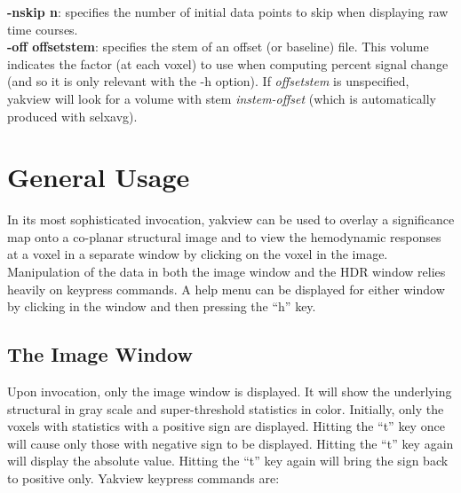 \documentclass[10pt]{article}
\begin{document}
\noindent
{\bf -nskip n}: specifies the number of initial data points to skip
when displaying raw time courses.\\

\noindent
{\bf -off offsetstem}: specifies the stem of an offset (or baseline)
file.  This volume indicates the factor (at each voxel) to use when
computing percent signal change (and so it is only relevant with the
-h option).  If {\em offsetstem} is unspecified, yakview will look for
a volume with stem {\em instem-offset} (which is automatically
produced with selxavg).\\

\section{General Usage}

In its most sophisticated invocation, yakview can be used to overlay a
significance map onto a co-planar structural image and to view the
hemodynamic responses at a voxel in a separate window by clicking on
the voxel in the image.  Manipulation of the data in both the image
window and the HDR window relies heavily on keypress commands.  A help
menu can be displayed for either window by clicking in the window and
then pressing the ``h'' key.

\subsection{The Image Window}

Upon invocation, only the image window is displayed. It will show the
underlying structural in gray scale and super-threshold statistics in
color.  Initially, only the voxels with statistics with a positive sign
are displayed.  Hitting the ``t'' key once will cause only those with
negative sign to be displayed. Hitting the ``t'' key again will
display the absolute value. Hitting the ``t'' key again will bring the
sign back to positive only.  Yakview keypress commands are:
\end{document}
